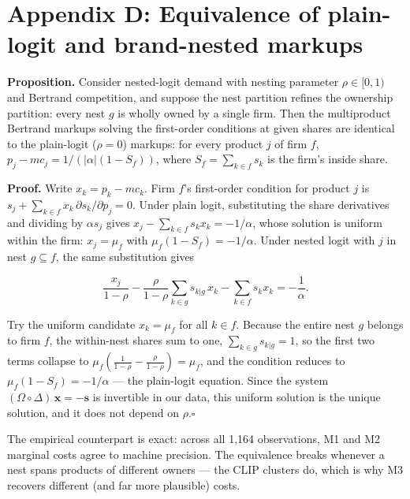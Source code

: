 \vspace{1em}

\section*{Appendix D: Equivalence of plain-logit and brand-nested
markups}\label{appendix-d-equivalence-of-plain-logit-and-brand-nested-markups}

\textbf{Proposition.} Consider nested-logit demand with nesting
parameter \(\rho \in [0,1)\) and Bertrand competition, and suppose the
nest partition refines the ownership partition: every nest \(g\) is
wholly owned by a single firm. Then the multiproduct Bertrand markups
solving the first-order conditions at given shares are identical to the
plain-logit (\(\rho = 0\)) markups: for every product \(j\) of firm
\(f\), \(p_j - mc_j = 1/(|\alpha|(1 - S_f))\), where
\(S_f = \sum_{k \in f} s_k\) is the firm's inside share.

\textbf{Proof.} Write \(x_k = p_k - mc_k\). Firm \(f\)'s first-order
condition for product \(j\) is
\(s_j + \sum_{k \in f} x_k\, \partial s_k / \partial p_j = 0\). Under
plain logit, substituting the share derivatives and dividing by
\(\alpha s_j\) gives \(x_j - \sum_{k \in f} s_k x_k = -1/\alpha\), whose
solution is uniform within the firm: \(x_j = \mu_f\) with
\(\mu_f(1 - S_f) = -1/\alpha\). Under nested logit with \(j\) in nest
\(g \subseteq f\), the same substitution gives

\[\frac{x_j}{1-\rho} - \frac{\rho}{1-\rho} \sum_{k \in g} s_{k|g}\, x_k - \sum_{k \in f} s_k x_k = -\frac{1}{\alpha}.\]

Try the uniform candidate \(x_k = \mu_f\) for all \(k \in f\). Because
the entire nest \(g\) belongs to firm \(f\), the within-nest shares sum
to one, \(\sum_{k \in g} s_{k|g} = 1\), so the first two terms collapse
to
\(\mu_f\left(\tfrac{1}{1-\rho} - \tfrac{\rho}{1-\rho}\right) = \mu_f\),
and the condition reduces to \(\mu_f (1 - S_f) = -1/\alpha\) --- the
plain-logit equation. Since the system
\((\Omega \circ \Delta)\,\mathbf{x} = -\mathbf{s}\) is invertible in our
data, this uniform solution is the unique solution, and it does not
depend on \(\rho\).\hfill\(\square\)

The empirical counterpart is exact: across all 1,164 observations, M1
and M2 marginal costs agree to machine precision. The equivalence breaks
whenever a nest spans products of different owners --- the CLIP clusters
do, which is why M3 recovers different (and far more plausible) costs.

